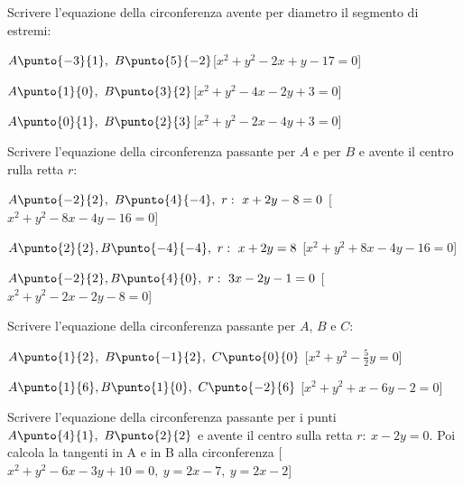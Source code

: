 \begin{esercizio}\label{ese:}
Scrivere l'equazione della circonferenza avente per diametro il segmento di 
estremi:
 \begin{enumeratea}
  \item  \(A\punto{-3}{1},~B\punto{5}{-2}\)\hfill [\(x^2+y^2-2x+y-17=0\)]
  \item  \(A\punto{1}{0},~B\punto{3}{2}\)\hfill [\(x^2+y^2-4x-2y+3=0\)]
  \item  \(A\punto{0}{1},~B\punto{2}{3}\)\hfill [\(x^2+y^2-2x-4y+3=0\)]
 \end{enumeratea}
\end{esercizio}

\begin{esercizio}\label{ese:}
Scrivere l'equazione della circonferenza passante per \(A\) e per \(B\) e 
avente il centro rulla retta \(r\):
 \begin{enumeratea}
  \item  \(A\punto{-2}{2},~B\punto{4}{-4},~r:~x+2y-8=0\)
  \hfill [\(x^2+y^2-8x-4y-16=0\)]
  \item  \(A\punto{2}{2}, B\punto{-4}{-4},~r:~x+2y=8\)
  \hfill [\(x^2+y^2+8x-4y-16=0\)]
  \item  \(A\punto{-2}{2}, B\punto{4}{0},~r:~3x-2y-1=0\)
  \hfill [\(x^2+y^2-2x-2y-8=0\)]
 \end{enumeratea}
\end{esercizio}

\begin{esercizio}\label{ese:}
Scrivere l'equazione della circonferenza passante per \(A\), \(B\) e \(C\):
 \begin{enumeratea}
  \item  \(A\punto{1}{2},~B\punto{-1}{2},~C\punto{0}{0}\)
  \hfill [\(x^2+y^2-\frac{5}{2}y=0\)]
  \item  \(A\punto{1}{6}, B\punto{1}{0},~C\punto{-2}{6}\)
  \hfill [\(x^2+y^2+x-6y-2=0\)]
 \end{enumeratea}
\end{esercizio}

\begin{esercizio}\label{ese:}        
Scrivere l'equazione della circonferenza passante per i punti 
\(A\punto{4}{1},~B\punto{2}{2}\) e avente il centro sulla retta \(r:~x-2y=0\).
Poi calcola la tangenti in A e in B alla circonferenza 
\hfill [\(x^2+y^2-6x-3y+10=0,~y=2x-7,~y=2x-2\)]
\end{esercizio}

